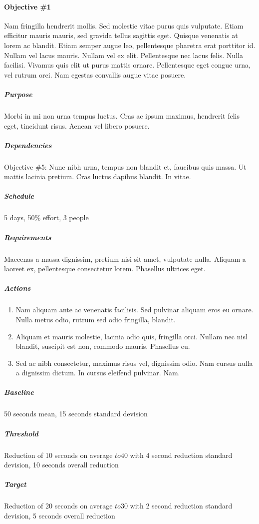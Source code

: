 		\paragraph{Objective \#1}
		Nam fringilla hendrerit mollis. Sed molestie vitae purus quis vulputate. Etiam efficitur mauris mauris, sed gravida tellus sagittis eget. Quisque venenatis at lorem ac blandit. Etiam semper augue leo, pellentesque pharetra erat porttitor id. Nullam vel lacus mauris. Nullam vel ex elit. Pellentesque nec lacus felis. Nulla facilisi. Vivamus quis elit ut purus mattis ornare. Pellentesque eget congue urna, vel rutrum orci. Nam egestas convallis augue vitae posuere.

			\subparagraph{Purpose} Morbi in mi non urna tempus luctus. Cras ac ipsum maximus, hendrerit felis eget, tincidunt risus. Aenean vel libero posuere.

			\subparagraph{Dependencies} Objective \#5: Nunc nibh urna, tempus non blandit et, faucibus quis massa. Ut mattis lacinia pretium. Cras luctus dapibus blandit. In vitae.

			\subparagraph{Schedule} 5 days, 50\% effort, 3 people

			\subparagraph{Requirements} Maecenas a massa dignissim, pretium nisi sit amet, vulputate nulla. Aliquam a laoreet ex, pellentesque consectetur lorem. Phasellus ultrices eget.

			\subparagraph{Actions} 
				\begin{enumerate}
					\item Nam aliquam ante ac venenatis facilisis. Sed pulvinar aliquam eros eu ornare. Nulla metus odio, rutrum sed odio fringilla, blandit.
					\item Aliquam et mauris molestie, lacinia odio quis, fringilla orci. Nullam nec nisl blandit, suscipit est non, commodo mauris. Phasellus eu.
					\item Sed ac nibh consectetur, maximus risus vel, dignissim odio. Nam cursus nulla a dignissim dictum. In cursus eleifend pulvinar. Nam.
				\end{enumerate}
				
			\subparagraph{Baseline} 50 seconds mean, 15 seconds standard devision

			\subparagraph{Threshold} Reduction of 10 seconds on average \(to 40\) with 4 second reduction standard devision, 10 seconds overall reduction 

			\subparagraph{Target} Reduction of 20 seconds on average \(to 30\) with 2 second reduction standard devision, 5 seconds overall reduction 

